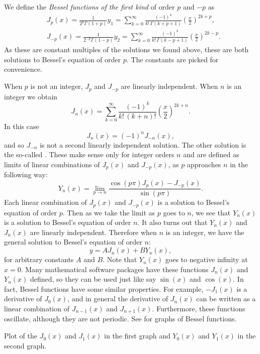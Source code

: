 We define the \emph{Bessel functions of the first kind}%
 of
order $p$ and $-p$ as
\begin{align*}
& J_p(x) = \frac{1}{2^p\Gamma(1+p)} y_1
=
\sum_{k=0}^\infty
\frac{{(-1)}^k}{k! \, \Gamma(k+p+1)}
{\left(\frac{x}{2}\right)}^{2k+p} ,
\\
& J_{-p}(x) = \frac{1}{2^{-p}\Gamma(1-p)} y_2
=
\sum_{k=0}^\infty
\frac{{(-1)}^k}{k! \,\Gamma(k-p+1)}
{\left(\frac{x}{2}\right)}^{2k-p} .
\end{align*}
As these are constant multiples of the solutions we found above, these are
both solutions to Bessel's equation of order $p$.  The constants are picked
for convenience.

When $p$ is not an integer, $J_p$
and $J_{-p}$ are linearly independent.  When $n$ is an integer we 
obtain
\begin{equation*}
J_n(x) =
\sum_{k=0}^\infty
\frac{{(-1)}^k}{k! \,(k+n)!}
{\left(\frac{x}{2}\right)}^{2k+n} .
\end{equation*}
In this case
\begin{equation*}
J_n(x) = {(-1)}^nJ_{-n}(x) ,
\end{equation*}
and so $J_{-n}$ is not a second linearly independent
solution.  The other solution is the
so-called \emph{}.  These make
sense only for integer orders $n$ and
are defined as limits of linear combinations of $J_p(x)$ and $J_{-p}(x)$, as
$p$ approaches $n$ in the
following way:
\begin{equation*}
Y_n(x) = \lim_{p\to n} \frac{\cos(p \pi) J_p(x) - J_{-p}(x)}{\sin(p \pi)} .
\end{equation*}
Each linear combination of $J_p(x)$ and $J_{-p}(x)$ is a solution
to Bessel's equation of order $p$.  Then as we take the limit as $p$
goes to $n$, we see that $Y_n(x)$ is a solution to Bessel's equation of
order $n$.  It also turns out that $Y_n(x)$ and $J_n(x)$ are linearly
independent.  Therefore when $n$ is an integer, we have the
general solution to Bessel's equation of order $n$:
\begin{equation*}
y = A J_n(x) + B Y_n(x) ,
\end{equation*}
for arbitrary constants $A$ and $B$.  Note that
$Y_n(x)$ goes to negative infinity at $x=0$.   Many mathematical software
packages have
these functions $J_n(x)$ and $Y_n(x)$ defined, so they can be used
just like say $\sin(x)$ and $\cos(x)$.  In fact, Bessel functions
have some similar 
properties.  For example, $-J_1(x)$ is a derivative of $J_0(x)$, and
in general the derivative of $J_n(x)$ can be written as a linear
combination of $J_{n-1}(x)$ and $J_{n+1}(x)$.  Furthermore, these
functions oscillate, although they are not periodic.  See
 for graphs of Bessel functions.
\begin{myfig}
\capstart
\caption{Plot of the $J_0(x)$ and $J_1(x)$ in the first graph
and $Y_0(x)$ and $Y_1(x)$ in the second graph.\label{bessel:graphsfig}}
\end{myfig}


